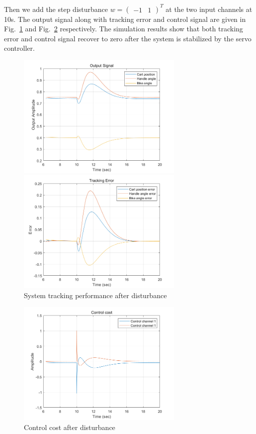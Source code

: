 \documentclass[hyperref]{article}
\theoremstyle{nonumberplain}
\begin{document}
	Then we add the step disturbance $w=\begin{pmatrix}
	-1 &1 
	\end{pmatrix}^{T}$ at the two input channels at 10s. The output signal along with tracking error and control signal are given in Fig.~\ref{fig27} and Fig.~\ref{fig28} respectively. The simulation results show that both tracking error and control signal recover to zero after the system is stabilized by the servo controller.
	
	\begin{figure}[H]
		\centering
		\begin{minipage}[t]{0.48\textwidth}
			\centering
			\includegraphics[width=8cm]{fig49.png}
		\end{minipage}
		\begin{minipage}[t]{0.48\textwidth}
			\centering
			\includegraphics[width=8cm]{fig50.png}
		\end{minipage}
		\caption{System tracking performance after disturbance}
		\label{fig27}
	\end{figure}
	
	\begin{figure}[H]
		\centering
		\includegraphics[width=8cm]{fig51.png}
		\caption{Control cost after disturbance}
		\label{fig28}
	\end{figure}
	
\end{document}

